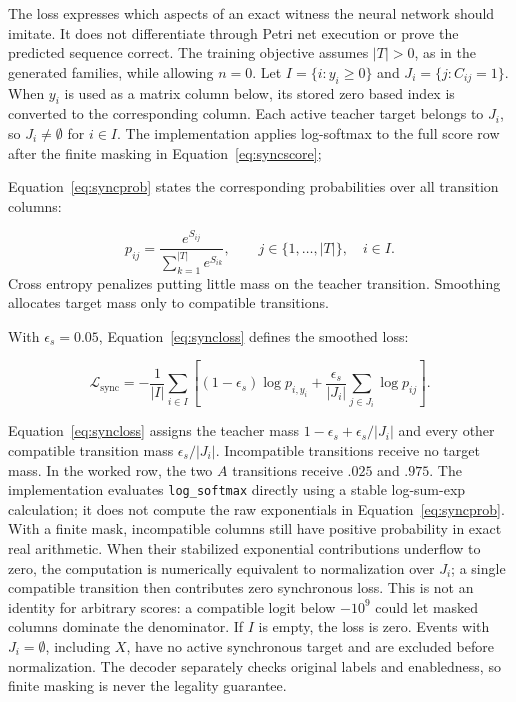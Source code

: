 The loss expresses which aspects of an exact witness the neural network should imitate. It does not differentiate through Petri net execution or prove the predicted sequence correct. The training objective assumes $|T|>0$, as in the generated families, while allowing $n=0$. Let $I=\{i:y_i\geq0\}$ and $J_i=\{j:C_{ij}=1\}$. When $y_i$ is used as a matrix column below, its stored zero based index is converted to the corresponding column. Each active teacher target belongs to $J_i$, so $J_i\ne\emptyset$ for $i\in I$. The implementation applies log-softmax to the full score row after the finite masking in Equation~\eqref{eq:syncscore}; \begin{revised}Equation~\eqref{eq:syncprob} states the corresponding probabilities over all transition columns:\end{revised}
\begin{equation}
 p_{ij}=\frac{e^{S_{ij}}}{\sum_{k=1}^{|T|}e^{S_{ik}}},\qquad j\in\{1,\ldots,|T|\},\quad i\in I.\label{eq:syncprob}
\end{equation}
Cross entropy penalizes putting little mass on the teacher transition. Smoothing allocates target mass only to compatible transitions. \begin{revised}With $\epsilon_s=0.05$, Equation~\eqref{eq:syncloss} defines the smoothed loss:\end{revised}
\begin{equation}
 \mathcal L_{\mathrm{sync}}=-\frac1{|I|}\sum_{i\in I}
 \left[(1-\epsilon_s)\log p_{i,y_i}
 +\frac{\epsilon_s}{|J_i|}\sum_{j\in J_i}\log p_{ij}\right].
 \label{eq:syncloss}
\end{equation}
\begin{revised}Equation~\eqref{eq:syncloss} assigns the teacher mass $1-\epsilon_s+\epsilon_s/|J_i|$ and every other compatible transition mass $\epsilon_s/|J_i|$. Incompatible transitions receive no target mass. In the worked row, the two $A$ transitions receive $.025$ and $.975$. The implementation evaluates \texttt{log\_softmax} directly using a stable log-sum-exp calculation; it does not compute the raw exponentials in Equation~\eqref{eq:syncprob}. With a finite mask, incompatible columns still have positive probability in exact real arithmetic. When their stabilized exponential contributions underflow to zero, the computation is numerically equivalent to normalization over $J_i$; a single compatible transition then contributes zero synchronous loss. This is not an identity for arbitrary scores: a compatible logit below $-10^9$ could let masked columns dominate the denominator. If $I$ is empty, the loss is zero. Events with $J_i=\emptyset$, including $X$, have no active synchronous target and are excluded before normalization. The decoder separately checks original labels and enabledness, so finite masking is never the legality guarantee.\end{revised}

